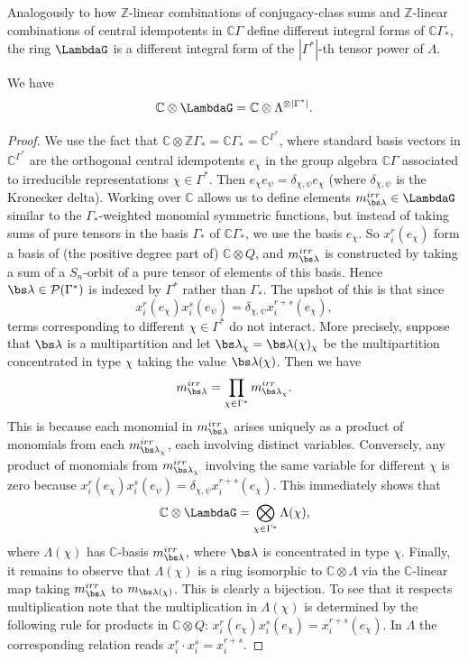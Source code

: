 Analogously to how $\mathbb{Z}$-linear combinations of conjugacy-class sums and $\mathbb{Z}$-linear combinations of central idempotents in $\mathbb{C}\Gamma$ define different integral forms of $\mathbb{C}\Gamma_*$, the ring $\LambdaG$ is a different integral form of the $|\Gamma^*|$-th tensor power of $\Lambda$.
\begin{proposition} \label{complex_bas_change_prop}
We have
\[
\mathbb{C} \otimes \LambdaG = \mathbb{C} \otimes \Lambda^{\otimes |\Gamma^*|}.
\]
\end{proposition}
\begin{proof}
We use the fact that $\mathbb{C} \otimes \mathbb{Z}\Gamma_* = \mathbb{C} \Gamma_* = \mathbb{C}^{\Gamma^*}$, where standard basis vectors in $\mathbb{C}^{\Gamma^*}$ are the orthogonal central idempotents $e_\chi$ in the group algebra $\mathbb{C}\Gamma$ associated to irreducible representations $\chi \in \Gamma^*$. Then $e_\chi e_{\psi} = \delta_{\chi, \psi} e_{\chi}$ (where $\delta_{\chi, \psi}$ is the Kronecker delta). Working over $\mathbb{C}$ allows us to define elements $m_{\bs\lambda}^{irr} \in \LambdaG$ similar to the $\Gamma_*$-weighted monomial symmetric functions, but instead of taking sums of pure tensors in the basis $\Gamma_*$ of $\mathbb{C}\Gamma_*$, we use the basis $e_\chi$. So $x_i^r (e_\chi)$ form a basis of (the positive degree part of) $\mathbb{C} \otimes Q$, and $m_{\bs\lambda}^{irr}$ is constructed by taking a sum of a $S_n$-orbit of a pure tensor of elements of this basis. Hence $\bs\lambda \in \mathcal{P}(\Gamma^*)$ is indexed by $\Gamma^*$ rather than $\Gamma_*$. The upshot of this is that since 
\[
x_i^r(e_\chi) x_i^s( e_\psi) = \delta_{\chi, \psi} x_i^{r+s}(e_\chi),
\]
terms corresponding to different $\chi \in \Gamma^*$ do not interact. More precisely, suppose that $\bs \lambda$ is a multipartition and let ${\bs \lambda}_\chi = {\bs \lambda}(\chi)_{\chi}$ be the multipartition concentrated in type $\chi$ taking the value $\bs \lambda(\chi)$. Then we have
\[
m_{\bs\lambda}^{irr} = \prod_{\chi \in \Gamma^*} m_{{\bs\lambda}_\chi}^{irr}.
\]
This is because each monomial in $m_{\bs\lambda}^{irr}$ arises uniquely as a product of monomials from each $m_{{\bs\lambda}_\chi}^{irr}$, each involving distinct variables. Conversely, any product of monomials from $m_{{\bs\lambda}_\chi}^{irr}$ involving the same variable for different $\chi$ is zero because $x_i^r(e_\chi) x_i^s( e_\psi) = \delta_{\chi, \psi} x_i^{r+s}(e_\chi)$. This immediately shows that
\[
\mathbb{C} \otimes \LambdaG = \bigotimes_{\chi \in \Gamma^*} \Lambda(\chi),
\]
where $\Lambda(\chi)$ has $\mathbb{C}$-basis $m_{\bs \lambda}^{irr}$, where $\bs\lambda$ is concentrated in type $\chi$. Finally, it remains to observe that $\Lambda(\chi)$ is a ring isomorphic to $\mathbb{C} \otimes \Lambda$ via the $\mathbb{C}$-linear map taking $m_{\bs\lambda}^{irr}$ to $m_{\bs\lambda(\chi)}$. This is clearly a bijection. To see that it respects multiplication note that the multiplication in $\Lambda(\chi)$ is determined by the following rule for products in $\mathbb{C} \otimes Q$: $x_i^r(e_\chi) x_i^s( e_\chi) = x_i^{r+s}(e_\chi)$. In $\Lambda$ the corresponding relation reads $x_i^r \cdot x_i^s = x_i^{r+s}$.
\end{proof}

